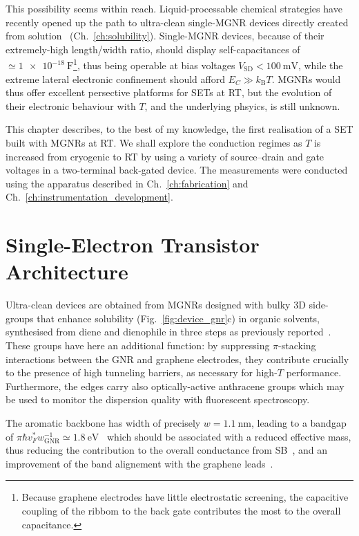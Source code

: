 This possibility seems within reach. Liquid-processable chemical strategies have recently opened up the path to ultra-clean single-MGNR devices directly created from solution~\cite{huang2018intrinsic,niu2019synthetic} (Ch.~\ref{ch:solubility}). Single-\gls{MGNR} devices, because of their extremely-high length/width ratio, should display self-capacitances of $\simeq\SI{1e-18}{\farad}$\footnote[2]{Because graphene electrodes have little electrostatic screening, the capacitive coupling of the ribbom to the back gate contributes the most to the overall capacitance.}, thus being operable at bias voltages $V_\textrm{SD}<\SI{100}{\milli\volt}$, while the extreme lateral electronic confinement should afford $E_C \gg k_\textrm{B} T$. \Glspl{MGNR} would thus offer excellent persective platforms for \glspl{SET} at \gls{RT}, but the evolution of their electronic behaviour with $T$, and the underlying phsyics, is still unknown.

This chapter describes, to the best of my knowledge, the first realisation of a \gls{SET} built with \glspl{MGNR} at \gls{RT}. We shall explore the conduction regimes as $T$ is increased from cryogenic to \gls{RT} by using a variety of source--drain and gate voltages in a two-terminal back-gated device. The measurements were conducted using the apparatus described in Ch.~\ref{ch:fabrication} and Ch.~\ref{ch:instrumentation_development}.

\section{Single-Electron Transistor Architecture}\label{ch:gnrset:sec:device_architecture}

Ultra-clean devices are obtained from \glspl{MGNR} designed with bulky 3D side-groups that enhance solubility (Fig.~\ref{fig:device_gnr}c) in organic solvents, synthesised from diene and dienophile in three steps as previously reported~\cite{huang2018intrinsic}. These groups have here an additional function: by suppressing $\pi$-stacking interactions between the GNR and graphene electrodes, they contribute crucially to the presence of high tunneling barriers, as necessary for high-$T$ performance. Furthermore, the edges carry also optically-active anthracene groups which may be used to monitor the dispersion quality with fluorescent spectroscopy.

The aromatic backbone has width of precisely $w=\SI{1.1}{\nano\metre}$, leading to a bandgap of $\pi \hbar v_F^* w^{-1}_\textrm{GNR} \simeq \SI{1.8}{\electronvolt}$~\cite{wakabayashi2010electronic} which should be associated with a reduced effective mass, thus reducing the contribution to the overall conductance from \gls{SB}~\cite{tung2014physics}, and an improvement of the band alignement with the graphene leads~\cite{Bennett2013}.

